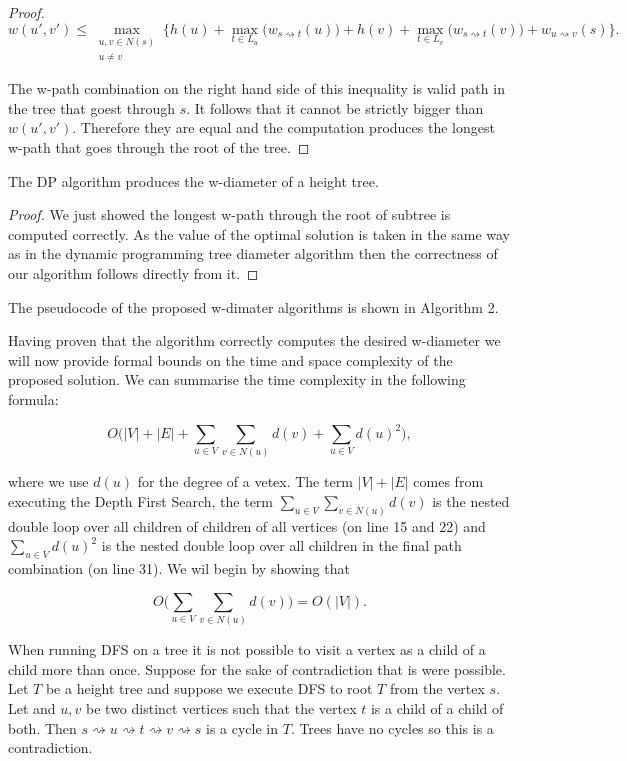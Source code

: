 \begin{proof}
   $$ w(u', v') \le \max\limits_{\substack{u, v \in N(s) \\ u \ne v}}\{ h(u) + \max\limits_{t \in L_u}\Big(w_{s \rightsquigarrow t}(u)\Big) + h(v) + \max\limits_{t \in L_v}\Big(w_{s \rightsquigarrow t}(v)\Big) + w_{u \rightsquigarrow v}(s)\}. $$

   The w-path combination on the right hand side of this inequality is valid path in the tree that goest through $s$. It follows that it cannot be strictly bigger than $w(u', v')$. Therefore they are equal and the computation produces the longest w-path that goes through the root of the tree.

   \end{proof}

\begin{lem} The DP algorithm produces the w-diameter of a height tree. \end{lem}

\begin{proof}

   We just showed the longest w-path through the root of subtree is computed correctly. As the value of the optimal solution is taken in the same way as in the dynamic programming tree diameter algorithm then the correctness of our algorithm follows directly from it.

\end{proof}

The pseudocode of the proposed w-dimater algorithms is shown in Algorithm 2.


Having proven that the algorithm correctly computes the desired w-diameter we will now provide formal bounds on the time and space complexity of the proposed solution. We can summarise the time complexity in the following formula:

$$ O\bigg( |V| + |E| + \sum_{u \in V}{\sum_{v \in N(u)}{d(v)}} + \sum_{u \in V}{d(u)^2}  \bigg) ,$$

where we use $d(u)$ for the degree of a vetex. The term $|V| + |E|$ comes from executing the Depth First Search, the term $\sum_{u \in V}{\sum_{v \in N(u)}{d(v)}}$ is the nested double loop over all children of children of all vertices (on line 15 and 22) and $\sum_{u \in V}{d(u)^2}$ is the nested double loop over all children in the final path combination (on line 31). We wil begin by showing that

$$ O\bigg( \sum_{u \in V}{\sum_{v \in N(u)}{d(v)}} \bigg) = O(|V|) .$$

When running DFS on a tree it is not possible to visit a vertex as a child of a child more than once. Suppose for the sake of contradiction that is were possible. Let $T$ be a height tree and suppose we execute DFS to root $T$ from the vertex $s$. Let and $u, v$ be two distinct vertices such that the vertex $t$ is a child of a child of both. Then $s \rightsquigarrow u \rightsquigarrow t \rightsquigarrow v \rightsquigarrow s$ is a cycle in $T$. Trees have no cycles so this is a contradiction.

